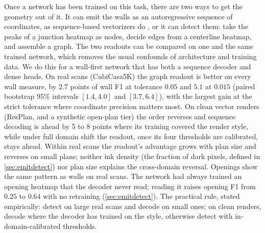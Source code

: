 \documentclass{article}
\begin{document}
Once a network has been trained on this task, there are two ways to get the
geometry out of it. It can emit the walls as an autoregressive sequence of
coordinates, as sequence-based vectorizers do
\citep{phung2026raster2seq,floorplanvlm2026,hu2024rastertograph}, or it can
detect them: take the peaks of a junction heatmap as nodes, decide edges from
a centerline heatmap, and assemble a graph. The two readouts can be compared on
one and the same trained network, which removes the usual confounds of
architecture and training data. We do this for a wall-first network that has
both a sequence decoder and dense heads. On real scans (CubiCasa5K) the graph
readout is better on every wall measure, by $2.7$ points of wall F1 at
tolerance $0.05$ and $5.1$ at $0.015$ (paired bootstrap 95\% intervals
$[1.4,4.0]$ and $[3.7,6.4]$), with the largest gain at the strict tolerance
where coordinate precision matters most. On clean vector renders
(ResPlan, and a synthetic open-plan tier) the order reverses and sequence
decoding is ahead by 5 to 8 points where its training covered the render
style, while under full domain shift the readout, once its four thresholds
are calibrated, stays ahead. Within
real scans the readout's advantage grows with plan size and reverses on small
plans; neither ink density (the fraction of dark pixels, defined in
\cref{sec:emitdetect}) nor plan size explains the cross-domain reversal.
Openings show the same pattern as walls on real scans. The network
had always trained an opening heatmap that the decoder never read; reading it
raises opening F1 from $0.25$ to $0.64$ with no retraining
(\cref{sec:emitdetect}). The practical rule, stated empirically: detect on large real scans and
decode on small ones; on clean renders, decode where the decoder has trained
on the style, otherwise detect with in-domain-calibrated thresholds.
\end{document}
